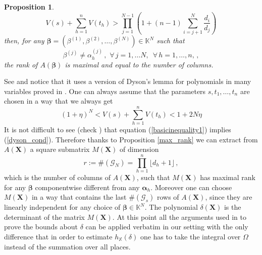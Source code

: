 \documentclass[10 pt,a4paper]{article}
\theoremstyle{plain}
\newtheorem{prop}[thm]{Proposition}
\theoremstyle{definition}
\theoremstyle{named}
\begin{document}
\begin{appendices}
\begin{prop}
\begin{equation}
V(s)+\sum_{h=1}^{n}V(t_h)> \prod_{j=1}^{N-1} \left(1+(n-1)\sum_{i=j+1}^{N}\frac{d_i}{d_{j}}\right)
\end{equation}
then, for any  $\bm{\beta}=(\beta^{(1)},\beta^{(2)},\dots,\beta^{(N)})\in\mathbb K^N$ such that
$$
\beta^{(j)}\neq \alpha^{(j)}_{h}
\,,\,\, \forall\, j=1,\dots N,\,\,\, \forall\, h=1,\dots , n,\,,
$$
the rank of $A(\bm{\beta})$ is maximal and equal to the number of columns.
\end{prop}
\proof See \cite[Proposition 2.1]{C} and notice that it uses a version of Dyson's lemma for polynomials in many variables proved in \cite{EV}.
\endproof
One can always assume that the parameters $s,t_1,\ldots,t_n$ are chosen in a way that we always get 
\begin{equation}\label{basicinequality1}
(1+\eta)^N<V(s)+\sum_{h=1}^{n}V(t_h)<1+2N\eta
\end{equation}
It is not difficult to see (check \cite[page 159]{C}) that equation (\ref{basicinequality1}) implies (\ref{dyson_cond}). Therefore thanks to  Proposition \ref{max_rank} we can extract from $ A(\bm X)$ a square submatrix $ M(\bm X)$ of dimension $$r:=\#(\mathcal G_N)=\prod^n_{h=1}\lfloor d_h+1\rfloor\,,$$ 
which is the number of columns of $ A(\bm X)$, such that $ M(\bm X)$ has maximal rank  for any $\bm\beta$ componentwise different from any $\bm\alpha_h$. Moreover one can choose $ M(\bm X)$ in a way that contains the last $\#(\mathcal G_s)$ rows of $A(\bm X)$, since they are linearly independent for any choice of $\bm \beta\in\mathbb K^N$. The polynomial $\delta(\bm X)$ is the determinant of the matrix $M(\bm X)$. At this point all the arguments used in \cite{C} to prove the bounds about $\delta$ can be applied verbatim in our setting with the only difference that in order to estimate $h_{\mathbb X}(\delta)$ one has to take the integral over $\Omega$ instead of the summation over all places.










\end{appendices}
\end{document}
